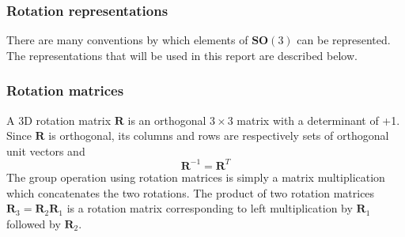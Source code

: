 		\begin{comment}
		\subsubsection{Adjoint map}
		EXPLANATION???? Hard to explain practical application without discussing reference frames: ie if position defined in body fixed frame but some other transformation defined in inertial frame. First undo rotation to get pose in inertial frame, apply transformation, then re-apply rotation.
		\begin{equation}
			\Psi_R: \mathbf{SO}(3) \rightarrow \mathbf{SO}(3) \textnormal{, }
			\Psi_R(A) \stackrel{\Delta}{=} RAR^{-1}
		\end{equation}
		Taking the derivative:
		\begin{equation}
			\frac{\partial}{\partial t} \Psi_R(A(t))|_{t=0} = RBR^{-1} \textnormal{, }
			B \stackrel{\Delta}{=} 	\frac{\partial}{\partial t}A(t)|_{t=0}
		\end{equation}
		The adjoint	representation of $\mathbf{SO}(3)$ is given by the mapping
		\begin{equation}
			\textbf{Adj}_R: \mathfrak{so}(3) \rightarrow \mathfrak{so}(3) \textnormal{, }
			\textbf{Adj}_R(B) \stackrel{\Delta}{=} RBR^{-1}
		\end{equation}
		\end{comment}
		
		\subsubsection{Rotation representations}	
		There are many conventions by which elements of $\mathbf{SO}(3)$ can be represented. The representations that will be used in this report are described below.
		
		\subsubsection{Rotation matrices}
		A 3D rotation matrix $\mathbf{R}$ is an orthogonal $3 \times 3$ matrix with a determinant of +1. Since $\mathbf{R}$ is orthogonal, its columns and rows are respectively sets of orthogonal unit vectors and
		\begin{equation}
			\mathbf{R}^{-1} = \mathbf{R}^{T}
		\end{equation}		
		The group operation using rotation matrices is simply a matrix multiplication which concatenates the two rotations. The product of two rotation matrices $\mathbf{R}_3 = \mathbf{R}_2\mathbf{R}_1$ is a rotation matrix corresponding to left multiplication by $\mathbf{R}_1$ followed by $\mathbf{R}_2$.
		
